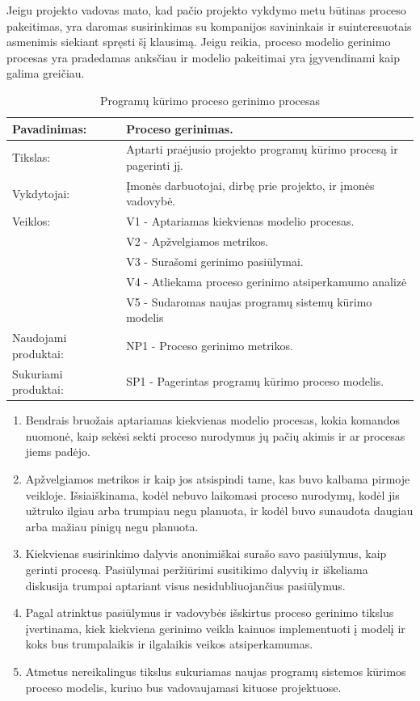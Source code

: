\documentclass{VUMIFPSkursinis}
\begin{document}
				Jeigu projekto vadovas mato, kad pačio projekto vykdymo metu būtinas proceso pakeitimas, yra daromas susirinkimas su kompanijos savininkais ir suinteresuotais asmenimis siekiant spręsti šį klausimą. 
				Jeigu reikia, proceso modelio gerinimo procesas yra pradedamas anksčiau ir modelio pakeitimai yra įgyvendinami kaip galima greičiau.
\pagebreak
	\begin{center}
		\begin{table}[ht]
			\caption{Programų kūrimo proceso gerinimo procesas}
			\begin{tabular}{ | l | l | }
				\hline
				Pavadinimas:		& Proceso gerinimas.						\\ \hline
				Tikslas:		& Aptarti praėjusio projekto programų kūrimo procesą ir pagerinti jį.			\\ \hline
				Vykdytojai:		& Įmonės darbuotojai, dirbę prie projekto, ir įmonės vadovybė.					\\ \hline
				Veiklos:		& V1 - Aptariamas kiekvienas modelio procesas. 				\\
							& V2 - Apžvelgiamos metrikos.	\\
							& V3 - Surašomi gerinimo pasiūlymai.				\\ 
							& V4 - Atliekama proceso gerinimo atsiperkamumo analizė \\ 
							& V5 - Sudaromas naujas programų sistemų kūrimo modelis \\ \hline
				Naudojami produktai:	& NP1 - Proceso gerinimo metrikos. 				\\ \hline
				Sukuriami produktai:	& SP1 - Pagerintas programų kūrimo proceso modelis.		\\ \hline
			\end{tabular}
		\end{table}
	\end{center}

	\begin{enumerate}
		\item{Bendrais bruožais aptariamas kiekvienas modelio procesas, kokia komandos nuomonė, kaip sekėsi sekti proceso nurodymus jų pačių akimis ir ar procesas jiems padėjo.}
		\item{Apžvelgiamos metrikos ir kaip jos atsispindi tame, kas buvo kalbama pirmoje veikloje. 
			Išsiaiškinama, kodėl nebuvo laikomasi proceso nurodymų, kodėl jis užtruko ilgiau arba trumpiau negu planuota, ir kodėl buvo sunaudota daugiau arba mažiau pinigų negu planuota.}
		\item{Kiekvienas susirinkimo dalyvis anonimiškai surašo savo pasiūlymus, kaip gerinti procesą.
			Pasiūlymai peržiūrimi susitikimo dalyvių ir iškeliama diskusija trumpai aptariant visus nesidubliuojančius pasiūlymus.}
		\item{Pagal atrinktus pasiūlymus ir vadovybės išskirtus proceso gerinimo tikslus įvertinama, kiek kiekviena gerinimo veikla kainuos implementuoti į modelį ir koks bus trumpalaikis ir ilgalaikis veikos atsiperkamumas.}
		\item{Atmetus nereikalingus tikslus sukuriamas naujas programų sistemos kūrimos proceso modelis, kuriuo bus vadovaujamasi kituose projektuose.}
	\end{enumerate}
\end{document}
